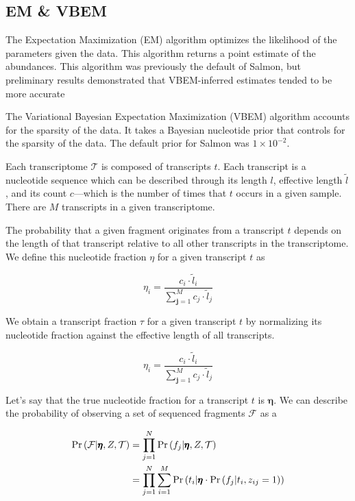 \subsection{EM \& VBEM}

The Expectation Maximization (EM) algorithm optimizes the likelihood of the parameters given the data. This algorithm returns a point estimate of the abundances. This algorithm was previously the default of Salmon, but preliminary results demonstrated that VBEM-inferred estimates tended to be more accurate \cite{noauthor_salmon_nodate}

The Variational Bayesian Expectation Maximization (VBEM) algorithm accounts for the sparsity of the data. It takes a Bayesian nucleotide prior that controls for the sparsity of the data. The default prior for Salmon was $1 \times 10 ^{-2}$.

Each transcriptome \(\mathcal{T}\) is composed of transcripts \(t\).
Each transcript is a nucleotide sequence which can be described through
its length \(l\), effective length \(\tilde l\), and its count
\(c\)---which is the number of times that \(t\) occurs in a given
sample. There are \(M\) transcripts in a given transcriptome.

The probability that a given fragment originates from a transcript \(t\)
depends on the length of that transcript relative to all other
transcripts in the transcriptome. We define this nucleotide fraction
\(\eta\) for a given transcript \(t\) as

\[\eta_i= \dfrac{c_i \cdot \tilde l _i}{\sum^{M}_{\pmb{j} = 1}c_j \cdot \tilde l _j}\]

We obtain a transcript fraction \(\tau\) for a given transcript \(t\) by
normalizing its nucleotide fraction against the effective length of all
transcripts.

\[\eta_i= \dfrac{c_i \cdot \tilde l _i}{\sum^{M}_{\pmb{j} = 1}c_j \cdot \tilde l _j}\]

Let's say that the true nucleotide fraction for a transcript \(t\) is
\(\pmb{\eta}\). We can describe the probability of observing a set of
sequenced fragments \(\mathcal{F}\) as a

\[
$$	
\begin{align*}
	\Pr\left( \mathcal{F}| \pmb{\eta}, Z, \mathcal{T} \right) &= \prod^{N}_{j=1} \Pr\left( f_j| \pmb{\eta}, Z, \mathcal{T} \right)\\
	&= \prod^{N}_{j=1}\sum^{M}_{i=1} \Pr\left( t_i| \pmb{\eta} \cdot \Pr\left( f_j|t_i,z _{ij} =1 \right)  \right)
\end{align*}
$$
\]

